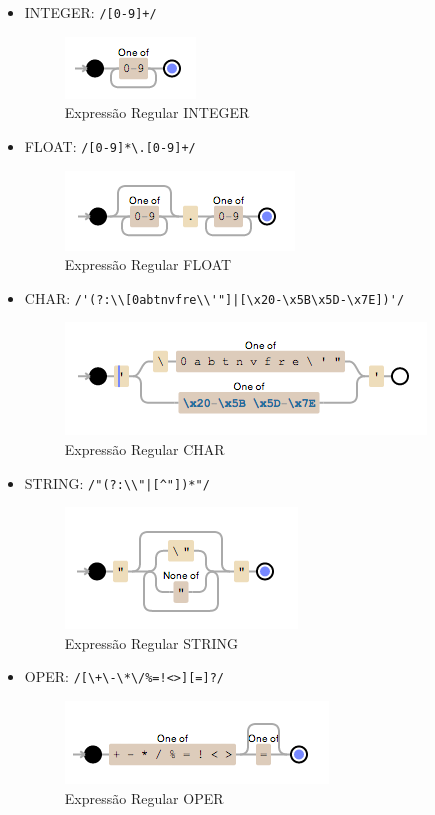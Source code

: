 \begin{itemize}
	\item INTEGER: \verb!/[0-9]+/!
	
	\begin{figure}[H]
		\centering 
		\includegraphics{images/REGEX/5-INTEGER.png}  
		\caption{Expressão Regular INTEGER}
	\end{figure}
	
	\item FLOAT: \verb!/[0-9]*\.[0-9]+/!
	
	\begin{figure}[H]
		\centering 
		\includegraphics{images/REGEX/6-FLOAT.png}  
		\caption{Expressão Regular FLOAT}
	\end{figure}
	
	\item CHAR: \verb!/'(?:\\[0abtnvfre\\'"]|[\x20-\x5B\x5D-\x7E])'/!
	
	\begin{figure}[H]
		\centering 
		\includegraphics{images/REGEX/7-CHAR.png}  
		\caption{Expressão Regular CHAR}
	\end{figure}
	
	\item STRING: \verb!/"(?:\\"|[^"])*"/!
	
	\begin{figure}[H]
		\centering 
		\includegraphics{images/REGEX/8-STRING.png}  
		\caption{Expressão Regular STRING}
	\end{figure}
	
	\item OPER: \verb$/[\+\-\*\/%=!<>][=]?/$
	
	\begin{figure}[H]
		\centering 
		\includegraphics{images/REGEX/9-OPER.png}  
		\caption{Expressão Regular OPER}
	\end{figure}

\end{itemize}
